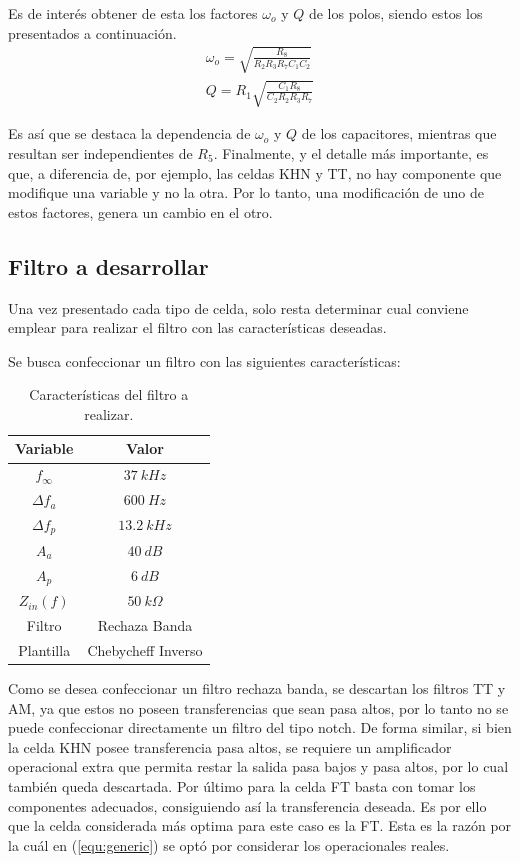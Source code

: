 Es de interés obtener de esta los factores $\omega_o$ y $Q$ de los polos, siendo estos los presentados a continuación.
\begin{equation}
\begin{split}
	\omega_o = \sqrt{\frac{R_8}{R_2 R_3 R_7 C_1 C_2}} \\
	Q = R_1 \sqrt{\frac{C_1 R_8}{C_2 R_2 R_3 R_7}} 
\end{split}
\label{equ:woq-ft}
\end{equation}

Es así que se destaca la dependencia de $\omega_o$ y $Q$ de los capacitores, mientras que resultan ser independientes de $R_5$. Finalmente, y el detalle más importante, es que, a diferencia de, por ejemplo, las celdas KHN y TT, no hay componente que modifique una variable y no la otra. Por lo tanto, una modificación de uno de estos factores, genera un cambio en el otro.

\subsection{Filtro a desarrollar}
Una vez presentado cada tipo de celda, solo resta determinar cual conviene emplear para realizar el filtro con las características deseadas.

Se busca confeccionar un filtro con las siguientes características:
\begin{table}[H]
\centering
\begin{tabular}{cc}
\hline
\textbf{Variable} & \textbf{Valor} \\
\hline
$f_\infty$ & $37 \ kHz$ \\
$\Delta f_a$ & $600 \ Hz$ \\
$\Delta f_p$ & $13.2 \ kHz$ \\
$A_a$ & $40 \ dB$ \\
$A_p$ & $6 \ dB$ \\
$Z_{in}(f)$ & $50 \ k\Omega$ \\
Filtro & Rechaza Banda \\
Plantilla & Chebycheff Inverso \\
\hline
\end{tabular}
\caption{Características del filtro a realizar.}
\label{tabla:caracteristicas1}
\end{table}

Como se desea confeccionar un filtro rechaza banda, se descartan los filtros TT y AM, ya que estos no poseen transferencias que sean pasa altos, por lo tanto no se puede confeccionar directamente un filtro del tipo notch. De forma similar, si bien la celda KHN posee transferencia pasa altos, se requiere un amplificador operacional extra que permita restar la salida pasa bajos y pasa altos, por lo cual también queda descartada. Por último para la celda FT basta con tomar los componentes adecuados, consiguiendo así la transferencia deseada. Es por ello que la celda considerada más optima para este caso es la FT. Esta es la razón por la cuál en (\ref{equ:generic}) se optó por considerar los operacionales reales.

